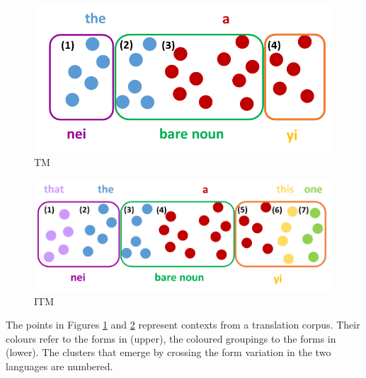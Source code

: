 \documentclass[output=paper,
modfonts
]{langscibook}
\begin{document}
\begin{figure}[t]
\includegraphics[height=.2\textheight]{figures/TM.png}
\caption{TM}
\label{fig:lebruyn:3}
\end{figure}

\begin{figure}[t]
	\includegraphics[height=.2\textheight]{figures/ITM.png}
	\caption{ITM}
	\label{fig:lebruyn:4}
\end{figure}

The points in Figures \ref{fig:lebruyn:3} and \ref{fig:lebruyn:4} represent contexts from a translation corpus. Their colours refer to the forms in  (upper), the coloured groupings to the forms in  (lower). The clusters that emerge by crossing the form variation in the two languages are numbered.
\end{document}
